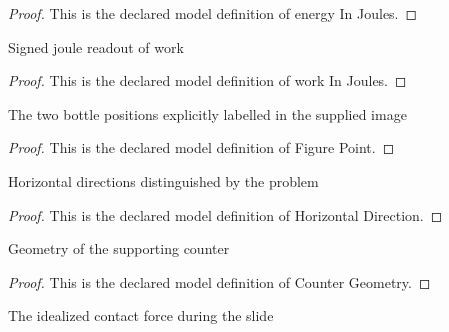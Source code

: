 \begin{proof}
  This is the declared model definition of energy In Joules.
\end{proof}
\begin{definition}
  \label{def:physics:phyx-mini-0798:phyxminiproblems-problemphyxmini0798-workinjoules}
  Signed joule readout of work
\end{definition}
\begin{proof}
  This is the declared model definition of work In Joules.
\end{proof}
\begin{definition}
  \label{def:physics:phyx-mini-0798:phyxminiproblems-problemphyxmini0798-figurepoint}
  The two bottle positions explicitly labelled in the supplied image
\end{definition}
\begin{proof}
  This is the declared model definition of Figure Point.
\end{proof}
\begin{definition}
  \label{def:physics:phyx-mini-0798:phyxminiproblems-problemphyxmini0798-horizontaldirection}
  Horizontal directions distinguished by the problem
\end{definition}
\begin{proof}
  This is the declared model definition of Horizontal Direction.
\end{proof}
\begin{definition}
  \label{def:physics:phyx-mini-0798:phyxminiproblems-problemphyxmini0798-countergeometry}
  Geometry of the supporting counter
\end{definition}
\begin{proof}
  This is the declared model definition of Counter Geometry.
\end{proof}
\begin{definition}
  \label{def:physics:phyx-mini-0798:phyxminiproblems-problemphyxmini0798-contactforcemodel}
  The idealized contact force during the slide
\end{definition}
